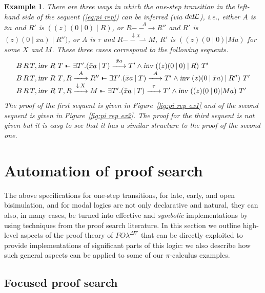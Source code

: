 \documentclass{acmtrans2m}
\newenvironment{example}{\begin{exa} \rm}{\end{exa}}
\newtheorem{exa}[theorem]{Example}
\def\relbar{\mathrel{\smash-}}
\def\joinrelm{\mathrel{\mkern-3.2mu}}
\def\tailpiece{\kern 1pt\vrule height 1ex width 0.3ex depth -.25ex}
\def\seqsym{\mathrel{\tailpiece\joinrelm\relbar}}
\newcommand{\FOL   }{FO\lambda}
\newcommand{\FOLDNb}{\FOL^{\Delta\nabla}}
\newcommand{\Seq}[2]{#1\seqsym #2}
\newcommand{\defL}{\hbox{\sl def}{\cal L}}
\newcommand{\inact}{\mathop{\downarrow}}
\newcommand{\one  }[3]{#1\stackrel{#2}{-\!\!-\!\!\!\rightarrow    } #3}
\newcommand{\onep }[3]{#1\stackrel{#2}{-\!\!-\!\!\!\rightharpoonup} #3}
\newcommand{\barpi}{\mathbin{|}}
\begin{document}
\begin{example}
There are three ways in which the one-step transition
in the left-hand side of the sequent (\ref{eq:pi rep}) can be inferred 
(via $\defL$), 
{\em i.e.}, either $A$ is $\bar{x}a$ and $R'$ is $((z)(0\barpi 0)\barpi R)$, or
$\one{R}{A}{R''}$ and $R'$ is $(z)(0\barpi \bar{x}a)\barpi R'')$, or $A$ is $\tau$ and 
$\onep{R}{\inact X}{M}$, $R'$ is $((z)(0\barpi 0) | Ma)$
for some $X$ and $M$. These three cases correspond to the following sequents.
$$
\begin{array}{l}
\Seq{B\,R\,T, \invar{R}{T}}{	
\exists T'.\one{(\bar{x}a\barpi T)}{\bar{x}a}{T'} \land 
   \invar{((z)(0\barpi 0)\barpi R)}{T'}
}\\
\Seq{B\,R\,T, \invar{R}{T}, \one{R}{A}{R''}}
	{
	\exists T'.\one{(\bar{x}a\barpi T)}{A}{T'} \land 
	\invar{(z)(0\barpi \bar{x}a)\barpi R'')}{T'}
	}	\\
\Seq{B\,R\,T, \invar{R}{T}, \one{R}{\inact X}{M}}
	{
	\exists T'.\one{(\bar{x}a\barpi T)}{\tau}{T'}
	\land \invar{((z)(0\barpi 0) | Ma)}{T'}
	}	
\end{array}
$$
The proof of the first sequent is given in Figure~\ref{fig:pi rep ex1} and of the
second sequent is given in Figure~\ref{fig:pi rep ex2}. 
The proof for the third sequent is not given but it is easy to see that
it has a similar structure to the proof of the second one.
\end{example}


\section{Automation of proof search}
\label{sec:auto}

The above specifications for one-step transitions, for late, early,
and open bisimulation, and for modal logics are not only declarative
and natural, they can also, in many cases, be turned into effective and
{\em symbolic} implementations by using techniques from the proof
search literature.  In this section we outline high-level aspects of
the proof theory of $\FOLDNb$ that can be directly exploited to
provide implementations of significant parts of this logic: we also
describe how such general aspects can be applied to some of our
$\pi$-calculus examples.

\subsection{Focused proof search}
\end{document}
